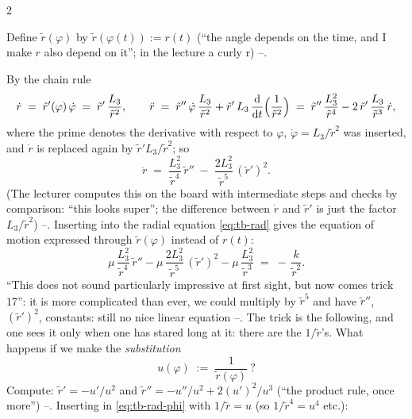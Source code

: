 \begin{paracol}{2}
\begin{definition}\label{def:tb-rtilde}
Define $\tilde r(\varphi)$ by $\tilde r(\varphi(t)):=r(t)$ (``the angle depends on the time, and I make $r$ also depend on it''; in the lecture a curly r) --.
\end{definition}
By the chain rule
\begin{equation}\label{eq:tb-chain}
  \dot r\;=\;\tilde r'(\varphi)\,\dot\varphi\;=\;\tilde r'\,\frac{L_3}{\tilde r^{2}},\qquad
  \ddot r\;=\;\tilde r''\,\dot\varphi\,\frac{L_3}{\tilde r^2}+\tilde r'\,L_3\,\frac{\mathrm d}{\mathrm dt}\Bigl(\frac1{\tilde r^2}\Bigr)
  \;=\;\tilde r''\,\frac{L_3^2}{\tilde r^4}-2\,\tilde r'\,\frac{L_3}{\tilde r^3}\,\dot r ,
\end{equation}
where the prime denotes the derivative with respect to $\varphi$, $\dot\varphi=L_3/\tilde r^2$ was inserted, and $\dot r$ is replaced again by $\tilde r'L_3/\tilde r^2$; so
\begin{equation}\label{eq:tb-chain2}
  \ddot r\;=\;\frac{L_3^2}{\tilde r^4}\,\tilde r''\;-\;\frac{2L_3^2}{\tilde r^5}\,(\tilde r')^2 .
\end{equation}
(The lecturer computes this on the board with intermediate steps and checks by comparison: ``this looks super''; the difference between $\dot r$ and $\tilde r'$ is just the factor $L_3/\tilde r^2$) --.
Inserting into the radial equation \eqref{eq:tb-rad} gives the equation of motion expressed through $\tilde r(\varphi)$ instead of $r(t)$:
\begin{equation}\label{eq:tb-rad-phi}
  \mu\,\frac{L_3^2}{\tilde r^4}\,\tilde r''-\mu\,\frac{2L_3^2}{\tilde r^5}\,(\tilde r')^2-\mu\,\frac{L_3^2}{\tilde r^3}\;=\;-\,\frac{k}{\tilde r^2}.
\end{equation}
``This does not sound particularly impressive at first sight, but now comes trick 17'': it is more complicated than ever, we could multiply by $\tilde r^5$ and have $\tilde r''$, $(\tilde r')^2$, constants: still no nice linear equation --.
The trick is the following, and one sees it only when one has stared long at it: there are the $1/\tilde r$'s. What happens if we make the \emph{substitution}
\begin{equation}\label{eq:tb-u}
  u(\varphi)\;:=\;\frac1{\tilde r(\varphi)}\ ?
\end{equation}
Compute: $\tilde r'=-u'/u^2$ and $\tilde r''=-u''/u^2+2(u')^2/u^3$ (``the product rule, once more'') --. Inserting in \eqref{eq:tb-rad-phi} with $1/\tilde r=u$ (so $1/\tilde r^4=u^4$ etc.):

\end{paracol}
